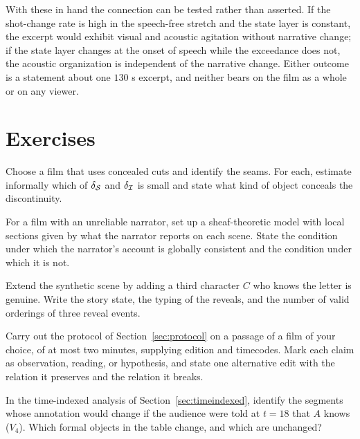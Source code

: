With these in hand the connection can be tested rather than asserted. If the shot-change rate is high in the speech-free stretch and the state layer is constant, the excerpt would exhibit visual and acoustic agitation without narrative change; if the state layer changes at the onset of speech while the exceedance does not, the acoustic organization is independent of the narrative change. Either outcome is a statement about one $130$ s excerpt, and neither bears on the film as a whole or on any viewer.


\section*{Exercises}

\begin{exercise}
Choose a film that uses concealed cuts and identify the seams. For each, estimate informally which of $\delta_{\mathcal{S}}$ and $\delta_{\mathcal{I}}$ is small and state what kind of object conceals the discontinuity.
\end{exercise}

\begin{exercise}
For a film with an unreliable narrator, set up a sheaf-theoretic model with local sections given by what the narrator reports on each scene. State the condition under which the narrator's account is globally consistent and the condition under which it is not.
\end{exercise}

\begin{exercise}
Extend the synthetic scene by adding a third character $C$ who knows the letter is genuine. Write the story state, the typing of the reveals, and the number of valid orderings of three reveal events.
\end{exercise}

\begin{exercise}
Carry out the protocol of Section~\ref{sec:protocol} on a passage of a film of your choice, of at most two minutes, supplying edition and timecodes. Mark each claim as observation, reading, or hypothesis, and state one alternative edit with the relation it preserves and the relation it breaks.
\end{exercise}

\begin{exercise}
In the time-indexed analysis of Section~\ref{sec:timeindexed}, identify the segments whose annotation would change if the audience were told at $t=18$ that $A$ knows ($V_4$). Which formal objects in the table change, and which are unchanged?
\end{exercise}
